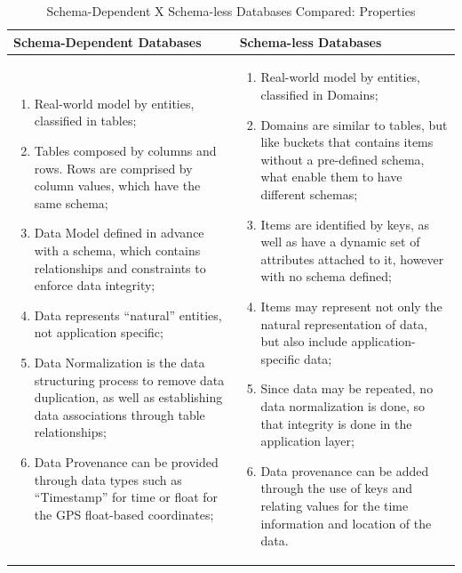 \begin{table}
    \label{tab:ysi-data-distribution}
    \caption{Schema-Dependent X Schema-less Databases Compared: Properties}
    \begin{center}
    \begin{tabular}{|p{210pt}|p{210pt}|}\hline
    Schema-Dependent Databases & Schema-less Databases\\\hline
    \begin{enumerate}
      \item Real-world model by entities, classified in tables;
      \item Tables composed by columns and rows. Rows are comprised by column
      values, which have the same schema;
      \item Data Model defined in advance with a schema, which contains
      relationships and constraints to enforce data integrity;
      \item Data represents ``natural'' entities, not application specific;
      \item Data Normalization is the data structuring process to remove data
      duplication, as well as establishing data associations through table
      relationships;
      \item Data Provenance can be provided through data types such as
      ``Timestamp'' for time or float for the GPS float-based coordinates; 
    \end{enumerate} 
    & 
    \begin{enumerate}
      \item Real-world model by entities, classified in Domains;
      \item Domains are similar to tables, but like buckets that contains items
      without a pre-defined schema, what enable them to have different schemas;
      \item Items are identified by keys, as well as have a dynamic set of
      attributes attached to it, however with no schema defined;
      \item Items may represent not only the natural representation of data, but
      also include application-specific data;
      \item Since data may be repeated, no data normalization is done, so that
      integrity is done in the application layer;
      \item Data provenance can be added through the use of keys and relating
      values for the time information and location of the data.
    \end{enumerate}
    \\\hline
    \end{tabular}
    \end{center}
\end{table}


